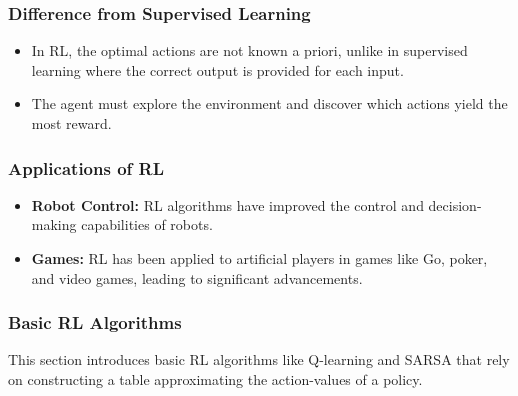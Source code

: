 \documentclass[8pt]{article}
\begin{document}
\subsubsection*{Difference from Supervised Learning}
\begin{itemize}
    \item In RL, the optimal actions are not known a priori, unlike in supervised learning where the correct output is provided for each input.
    \item The agent must explore the environment and discover which actions yield the most reward.
\end{itemize}

\subsubsection*{Applications of RL}
\begin{itemize}
    \item \textbf{Robot Control:} RL algorithms have improved the control and decision-making capabilities of robots.
    \item \textbf{Games:} RL has been applied to artificial players in games like Go, poker, and video games, leading to significant advancements.
\end{itemize}

\subsubsection*{Basic RL Algorithms}
This section introduces basic RL algorithms like Q-learning and SARSA that rely on constructing a table approximating the action-values of a policy.

\newpage
\end{document}
